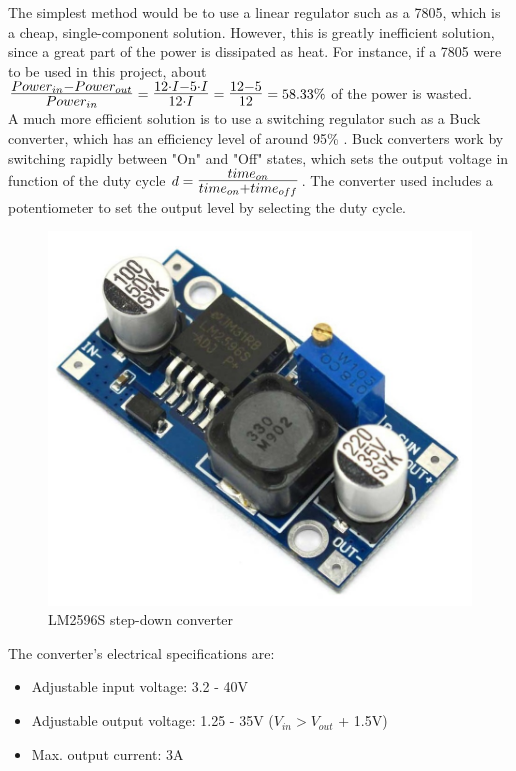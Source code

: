 		The simplest method would be to use a linear regulator such as a 7805, which is a cheap, single-component solution. However, this is greatly inefficient solution, since a great part of the power is dissipated as heat.
		For instance, if a 7805 were to be used in this project, about $\mbox{\Large $\frac{Power_{in} - Power_{out} }{Power_{in} }$}=\mbox{\Large $\frac{12 \cdot I -5 \cdot I}{12\cdot I}$}=\mbox{\Large $\frac{12-5}{12}$}=58.33\%$ of the power is wasted.\\


		A much more efficient solution is to use a switching regulator such as a Buck converter, which has an efficiency level of around 95\%  \cite{buck}. 
		Buck converters work by switching rapidly between "On" and "Off" states, which sets the output voltage in function of the duty cycle $d=\mbox{\Large $\frac{time_{on}}{time_{on}+time_{off}}$}$. The converter used includes a potentiometer to set the output level by selecting the duty cycle. 
 
		

			\begin{figure}[H]
					\centering
					\includegraphics[scale=0.2]{images/ProjectComponents/buck.jpg}
					\caption{LM2596S step-down converter }
					\label{}
			\end{figure}
			\bigskip

		The converter's electrical specifications are:
			\begin{itemize}
				\item Adjustable input voltage: 3.2 - 40V
				\item Adjustable output voltage: 1.25 - 35V ($V_{in} > V_{out}$ + 1.5V)       
				\item Max. output current: 3A
			\end{itemize}

